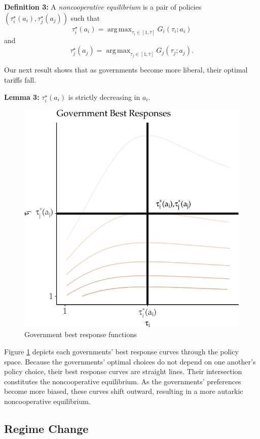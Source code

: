 \documentclass{puthesis}
\DeclareMathOperator*{\argmax}{arg\,max}
\begin{document}
\textbf{Definition 3:} A \emph{noncooperative equilibrium} is a pair of
policies \(\left( \tau_i^\star(a_i), \tau_j^\star(a_j) \right)\) such
that \[
\tau_i^\star(a_i) = \argmax_{\tau_i \in [1, \bar{\tau}]} G_i(\tau_i; a_i)
\] and \[
\tau_j^\star(a_j) = \argmax_{\tau_j \in [1, \bar{\tau}]} G_j(\tau_j; a_j) .
\]

Our next result shows that as governments become more liberal, their
optimal tariffs fall.

\textbf{Lemma 3:} \(\tau_i^\star(a_i)\) is strictly decreasing in
\(a_i\).

\begin{figure}
\centering
\includegraphics{figure/br-1.pdf}
\caption{Government best response functions \label{fig:br}}
\end{figure}

Figure \ref{fig:br} depicts each governments' best response curves
through the policy space. Because the governments' optimal choices do
not depend on one another's policy choice, their best response curves
are straight lines. Their intersection constitutes the noncooperative
equilibrium. As the governments' preferences become more biased, these
curves shift outward, resulting in a more autarkic noncooperative
equilibrium.

\subsection{Regime Change}
\end{document}
